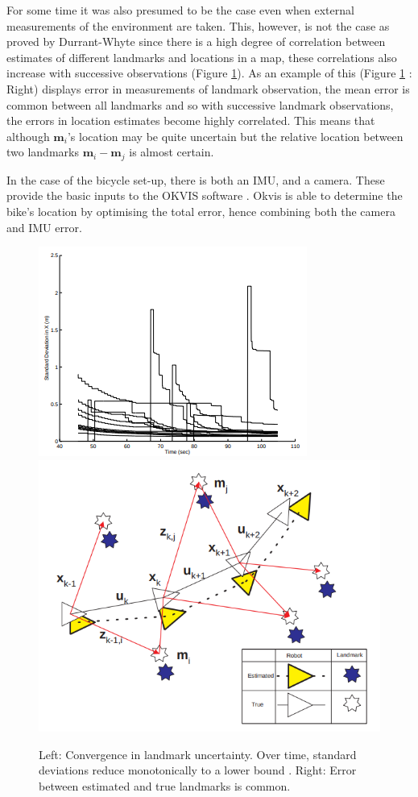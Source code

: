 \documentclass[a4paper,11pt,notitlepage]{article}
\begin{document}
For some time it was also presumed to be the case even when external measurements of the environment are taken. This, however, is not the case as proved by Durrant-Whyte \cite{F_Durr_1} since there is a high degree of correlation between estimates of different landmarks and locations in a map, these correlations also increase with successive observations (Figure \ref{slam_prob_fig}). As an example of this (Figure \ref{slam_prob_fig} : Right) displays error in measurements of landmark observation, the mean error is common between all landmarks and so with successive landmark observations, the errors in location estimates become highly correlated. This means that although $\textbf{m}_{i}$'s location may be quite uncertain but the relative location between two landmarks $\textbf{m}_{i}-\textbf{m}_{j}$ is almost certain.\newline\newline 

In the case of the bicycle set-up, there is both an IMU, and a camera. These provide the basic inputs to the OKVIS software \cite{Okvis_1}. Okvis is able to determine the bike's location by optimising the total error, hence combining both the camera and IMU error.

\noindent \begin{figure}[h!]
\includegraphics[width = 0.5\hsize]{figures/convergence_landmark_uncertainty.png}
\includegraphics[width = 0.5\hsize]{figures/ess_slam.png}
\caption{Left: Convergence in landmark uncertainty.  Over time, standard deviations reduce monotonically to a lower bound \cite{F_Durr_Pt1}. Right: Error between estimated and true landmarks is common.}
\label{slam_prob_fig}
\end{figure}
\end{document}
